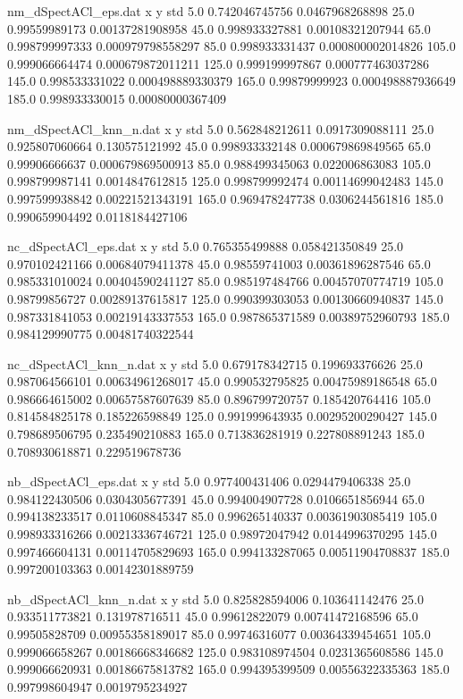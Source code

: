 \begin{filecontents}{nm_dSpectACl_eps.dat}
x y std
5.0 0.742046745756 0.0467968268898
25.0 0.99559989173 0.00137281908958
45.0 0.998933327881 0.00108321207944
65.0 0.998799997333 0.000979798558297
85.0 0.998933331437 0.000800002014826
105.0 0.999066664474 0.000679872011211
125.0 0.999199997867 0.000777463037286
145.0 0.998533331022 0.000498889330379
165.0 0.99879999923 0.000498887936649
185.0 0.998933330015 0.00080000367409
\end{filecontents}
\begin{filecontents}{nm_dSpectACl_knn_n.dat}
x y std
5.0 0.562848212611 0.0917309088111
25.0 0.925807060664 0.130575121992
45.0 0.998933332148 0.000679869849565
65.0 0.99906666637 0.000679869500913
85.0 0.988499345063 0.022006863083
105.0 0.998799987141 0.0014847612815
125.0 0.998799992474 0.00114699042483
145.0 0.997599938842 0.00221521343191
165.0 0.969478247738 0.0306244561816
185.0 0.990659904492 0.0118184427106
\end{filecontents}
\begin{filecontents}{nc_dSpectACl_eps.dat}
x y std
5.0 0.765355499888 0.058421350849
25.0 0.970102421166 0.00684079411378
45.0 0.98559741003 0.00361896287546
65.0 0.985331010024 0.00404590241127
85.0 0.985197484766 0.00457070774719
105.0 0.98799856727 0.00289137615817
125.0 0.990399303053 0.00130660940837
145.0 0.987331841053 0.00219143337553
165.0 0.987865371589 0.00389752960793
185.0 0.984129990775 0.00481740322544
\end{filecontents}
\begin{filecontents}{nc_dSpectACl_knn_n.dat}
x y std
5.0 0.679178342715 0.199693376626
25.0 0.987064566101 0.00634961268017
45.0 0.990532795825 0.00475989186548
65.0 0.986664615002 0.00657587607639
85.0 0.896799720757 0.185420764416
105.0 0.814584825178 0.185226598849
125.0 0.991999643935 0.00295200290427
145.0 0.798689506795 0.235490210883
165.0 0.713836281919 0.227808891243
185.0 0.708930618871 0.229519678736
\end{filecontents}
\begin{filecontents}{nb_dSpectACl_eps.dat}
x y std
5.0 0.977400431406 0.0294479406338
25.0 0.984122430506 0.0304305677391
45.0 0.994004907728 0.0106651856944
65.0 0.994138233517 0.0110608845347
85.0 0.996265140337 0.00361903085419
105.0 0.998933316266 0.00213336746721
125.0 0.98972047942 0.0144996370295
145.0 0.997466604131 0.00114705829693
165.0 0.994133287065 0.00511904708837
185.0 0.997200103363 0.00142301889759
\end{filecontents}
\begin{filecontents}{nb_dSpectACl_knn_n.dat}
x y std
5.0 0.825828594006 0.103641142476
25.0 0.933511773821 0.131978716511
45.0 0.99612822079 0.00741472168596
65.0 0.99505828709 0.00955358189017
85.0 0.99746316077 0.00364339454651
105.0 0.999066658267 0.00186668346682
125.0 0.983108974504 0.0231365608586
145.0 0.999066620931 0.00186675813782
165.0 0.994395399509 0.00556322335363
185.0 0.997998604947 0.0019795234927
\end{filecontents}
